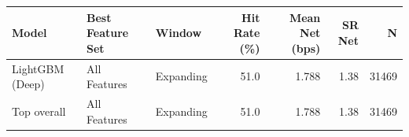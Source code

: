 \begin{tabular}{lllrrrr}
\toprule
Model & Best Feature Set & Window & Hit Rate (\%) & Mean Net (bps) & SR Net & N \\
\midrule
LightGBM (Deep) & All Features & Expanding & 51.0 & 1.788 & 1.38 & 31469 \\
\midrule
Top overall & All Features & Expanding & 51.0 & 1.788 & 1.38 & 31469 \\
\bottomrule
\end{tabular}
